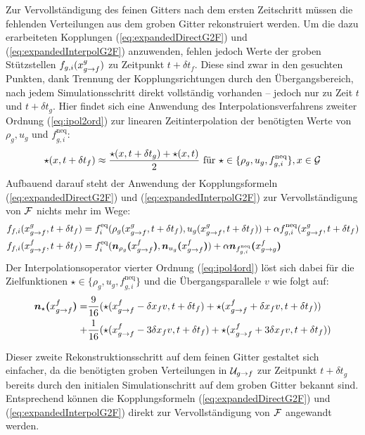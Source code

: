 \begin{description}[style=unboxed,leftmargin=0cm]
\item[Vervollständigung von \(\F\) zu Zeitpunkt \(t+\delta t_f\):] Zur Vervollständigung des feinen Gitters nach dem ersten Zeitschritt müssen die fehlenden Verteilungen aus dem groben Gitter rekonstruiert werden. Um die dazu erarbeiteten Kopplungen (\ref{eq:expandedDirectG2F}) und (\ref{eq:expandedInterpolG2F}) anzuwenden, fehlen jedoch Werte der groben Stützstellen \(\smash{f_{g,i}(x_{g \to f}^g})\) zu Zeitpunkt \(t+\delta t_f\). Diese sind zwar in den gesuchten Punkten, dank Trennung der Kopplungsrichtungen durch den Übergangsbereich, nach jedem Simulationsschritt direkt vollständig vorhanden -- jedoch nur zu Zeit \(t\) und \(t+\delta t_g\). Hier findet sich eine Anwendung des Interpolationsverfahrens zweiter Ordnung (\ref{eq:ipol2ord}) zur linearen Zeitinterpolation der benötigten Werte von \(\rho_g, u_g\) und \(f_{g,i}^\text{neq}\):
\[\star(x,t+\delta t_f) \approx \frac{\star(x,t+\delta t_g) + \star(x,t)}{2} \text{ für } \star \in \{\rho_g,u_g,f_{g,i}^\text{neq}\}, x \in \mathcal{G}\]
Aufbauend darauf steht der Anwendung der Kopplungsformeln (\ref{eq:expandedDirectG2F}) und (\ref{eq:expandedInterpolG2F}) zur Vervollständigung von \(\F\) nichts mehr im Wege:
\begin{align*}
f_{f,i}(x_{g \to f}^g,t+\delta t_f) &= f_i^\text{eq}(\rho_g(x_{g \to f}^g,t+\delta t_f), u_g(x_{g \to f}^g,t+\delta t_f)) + \alpha f_{g,i}^\text{neq}(x_{g \to f}^g,t+\delta t_f) \\
f_{f,i}(x_{g \to f}^f,t+\delta t_f) &= f_i^\text{eq}(\boldsymbol{n}_{\rho_g}\boldsymbol{(}{x_{g \to f}^f}\boldsymbol{)}, \boldsymbol{n}_{u_g}\boldsymbol{(}{x_{g \to f}^f}\boldsymbol{)}) + \alpha \boldsymbol{n}_{f_{g,i}^\text{neq}}\boldsymbol{(}{x_{g \to g}^f}\boldsymbol{)}
\end{align*}
Der Interpolationsoperator vierter Ordnung (\ref{eq:ipol4ord}) löst sich dabei für die Zielfunktionen \(\star \in \{\rho_g,u_g,f_{g,i}^\text{neq}\}\) und die Übergangsparallele \(v\) wie folgt auf:
\begin{align*}
\boldsymbol{n}_{\star}\boldsymbol{(}{x_{g \to f}^f}\boldsymbol{)} = &\frac{9}{16}(\star(x_{g \to f}^f-\delta x_f v, t+\delta t_f) + \star(x_{g \to f}^f+\delta x_f v, t+\delta t_f))\\
+ &\frac{1}{16}(\star(x_{g \to f}^f-3\delta x_f v, t+\delta t_f) + \star(x_{g \to f}^f+3\delta x_f v, t+\delta t_f))
\end{align*}

\item[Vervollständigung von \(\F\) zu Zeitpunkt \(t+\delta t_g\):] Dieser zweite Rekonstruktionsschritt auf dem feinen Gitter gestaltet sich einfacher, da die benötigten groben Verteilungen in \(\mathcal{U}_{g \to f}\) zur Zeitpunkt \(t+\delta t_g\) bereits durch den initialen Simulationschritt auf dem groben Gitter bekannt sind. Entsprechend können die Kopplungsformeln (\ref{eq:expandedDirectG2F}) und (\ref{eq:expandedInterpolG2F}) direkt zur Vervollständigung von \(\F\) angewandt werden.


\end{description}
